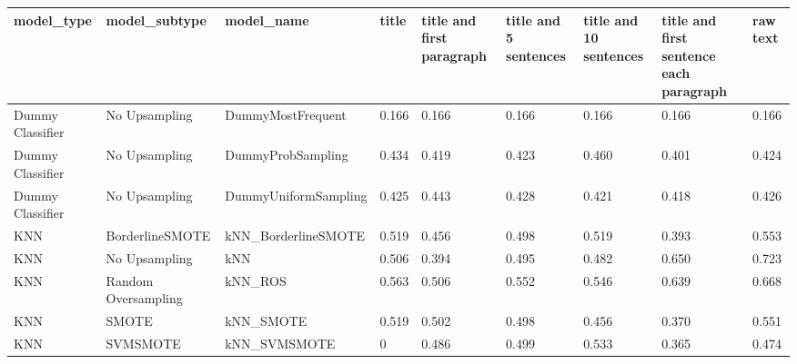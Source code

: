 \begin{tabular}{lllllllll}
\toprule
                  model\_type &       model\_subtype &                                   model\_name & title & title and first paragraph & title and 5 sentences & title and 10 sentences & title and first sentence each paragraph & raw text \\
\midrule
            Dummy Classifier &       No Upsampling &                            DummyMostFrequent & 0.166 &                     0.166 &                 0.166 &                  0.166 &                                   0.166 &    0.166 \\
            Dummy Classifier &       No Upsampling &                            DummyProbSampling & 0.434 &                     0.419 &                 0.423 &                  0.460 &                                   0.401 &    0.424 \\
            Dummy Classifier &       No Upsampling &                         DummyUniformSampling & 0.425 &                     0.443 &                 0.428 &                  0.421 &                                   0.418 &    0.426 \\
                         KNN &     BorderlineSMOTE &                          kNN\_BorderlineSMOTE & 0.519 &                     0.456 &                 0.498 &                  0.519 &                                   0.393 &    0.553 \\
                         KNN &       No Upsampling &                                          kNN & 0.506 &                     0.394 &                 0.495 &                  0.482 &                                   0.650 &    0.723 \\
                         KNN & Random Oversampling &                                      kNN\_ROS & 0.563 &                     0.506 &                 0.552 &                  0.546 &                                   0.639 &    0.668 \\
                         KNN &               SMOTE &                                    kNN\_SMOTE & 0.519 &                     0.502 &                 0.498 &                  0.456 &                                   0.370 &    0.551 \\
                         KNN &            SVMSMOTE &                                 kNN\_SVMSMOTE &     0 &                     0.486 &                 0.499 &                  0.533 &                                   0.365 &    0.474 \\

\end{tabular}

